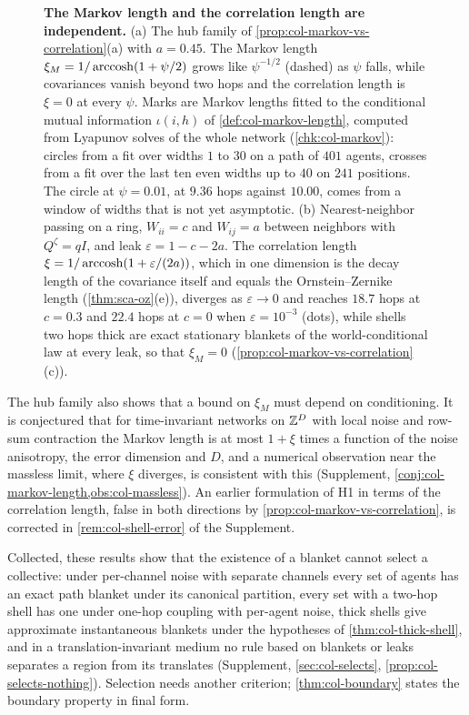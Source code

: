 \begin{figure}[t]
  \centering
  
  \caption{\textbf{The Markov length and the correlation length are independent.} (a) The hub family of \cref{prop:col-markov-vs-correlation}(a) with $a=0.45$. The Markov length $\xi_M=1/\operatorname{arccosh}(1+\psi/2)$ grows like $\psi^{-1/2}$ (dashed) as $\psi$ falls, while covariances vanish beyond two hops and the correlation length is $\xi=0$ at every $\psi$. Marks are Markov lengths fitted to the conditional mutual information $\iota(i,h)$ of \cref{def:col-markov-length}, computed from Lyapunov solves of the whole network (\cref{chk:col-markov}): circles from a fit over widths $1$ to $30$ on a path of $401$ agents, crosses from a fit over the last ten even widths up to $40$ on $241$ positions. The circle at $\psi=0.01$, at $9.36$ hops against $10.00$, comes from a window of widths that is not yet asymptotic. (b) Nearest-neighbor passing on a ring, $W_{ii}=c$ and $W_{ij}=a$ between neighbors with $Q^\zeta=qI$, and leak $\varepsilon=1-c-2a$. The correlation length $\xi=1/\operatorname{arccosh}(1+\varepsilon/(2a))$, which in one dimension is the decay length of the covariance itself and equals the Ornstein--Zernike length (\cref{thm:sca-oz}(e)), diverges as $\varepsilon\to0$ and reaches $18.7$ hops at $c=0.3$ and $22.4$ hops at $c=0$ when $\varepsilon=10^{-3}$ (dots), while shells two hops thick are exact stationary blankets of the world-conditional law at every leak, so that $\xi_M=0$ (\cref{prop:col-markov-vs-correlation}(c)).}
  \label{fig:col-markov}
\end{figure}

The hub family also shows that a bound on $\xi_M$ must depend on conditioning. It is conjectured that for time-invariant networks on $\mathbb{Z}^D$ with local noise and row-sum contraction the Markov length is at most $1+\xi$ times a function of the noise anisotropy, the error dimension and $D$, and a numerical observation near the massless limit, where $\xi$ diverges, is consistent with this (Supplement, \cref{conj:col-markov-length,obs:col-massless}). An earlier formulation of H1 in terms of the correlation length, false in both directions by \cref{prop:col-markov-vs-correlation}, is corrected in \cref{rem:col-shell-error} of the Supplement.

Collected, these results show that the existence of a blanket cannot select a collective: under per-channel noise with separate channels every set of agents has an exact path blanket under its canonical partition, every set with a two-hop shell has one under one-hop coupling with per-agent noise, thick shells give approximate instantaneous blankets under the hypotheses of \cref{thm:col-thick-shell}, and in a translation-invariant medium no rule based on blankets or leaks separates a region from its translates (Supplement, \cref{sec:col-selects}, \cref{prop:col-selects-nothing}). Selection needs another criterion; \cref{thm:col-boundary} states the boundary property in final form.

